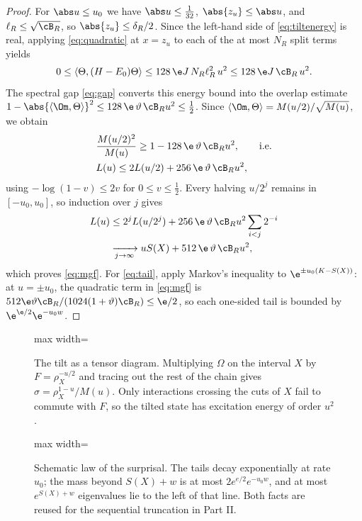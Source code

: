 \begin{proof}
For $\abs u\le u_0$ we have $\abs u\le\frac1{32}$, $\abs{z_u}\le\abs u$, and
$\ell_R\le\sqrt{\cB_R}$, so $\abs{z_u}\le\delta_R/2$. Since the left-hand
side of \eqref{eq:tiltenergy} is real, applying \eqref{eq:quadratic} at
$x=z_u$ to each of the at most $N_R$ split terms yields
\begin{equation}\label{eq:energyquad}
 0\le\langle\Theta,(H-E_0)\Theta\rangle\le 128\,\e J\,N_R\ell_R^2\,u^2
 \le 128\,\e J\,\cB_R\,u^2 .
\end{equation}
The spectral gap \eqref{eq:gap} converts this energy bound into the
overlap estimate
$1-\abs{\langle\Om,\Theta\rangle}^2\le 128\,\e\,\vartheta\,\cB_Ru^2\le\frac12$.
Since $\langle\Om,\Theta\rangle=M(u/2)/\sqrt{M(u)}$, we obtain
\[
\begin{split}
 &\frac{M(u/2)^2}{M(u)}\ge 1-128\,\e\,\vartheta\,\cB_R u^2,
 \qquad\text{i.e.}\\
 &L(u)\le 2L(u/2)+256\,\e\,\vartheta\,\cB_Ru^2,
\end{split}
\]
using $-\log(1-v)\le2v$ for $0\le v\le\frac12$. Every halving $u/2^j$
remains in $[-u_0,u_0]$, so induction over $j$ gives
\[
\begin{split}
 &L(u)\le 2^jL(u/2^j)+256\,\e\,\vartheta\,\cB_Ru^2\sum_{i<j}2^{-i}\\
 &\qquad\xrightarrow[j\to\infty]{} uS(X)+512\,\e\,\vartheta\,\cB_Ru^2 ,
\end{split}
\]
which proves \eqref{eq:mgf}. For \eqref{eq:tail}, apply Markov's inequality
to $\e^{\pm u_0(K-S(X))}$: at $u=\pm u_0$, the quadratic term in
\eqref{eq:mgf} is $512\e\vartheta\cB_R/(1024(1+\vartheta)\cB_R)\le\e/2$, so
each one-sided tail is bounded by $\e^{\e/2}\e^{-u_0w}$.
\end{proof}

\begin{figure}[t]
\centering
\begin{adjustbox}{max width=\linewidth}

\end{adjustbox}
\caption{The tilt as a tensor diagram. Multiplying $\Omega$ on the interval $X$ by $F=\rho_X^{-u/2}$ and tracing out the rest of the chain gives $\sigma=\rho_X^{1-u}/M(u)$. Only interactions crossing the cuts of $X$ fail to commute with $F$, so the tilted state has excitation energy of order $u^2$.}\label{fig:tilt}
\end{figure}

\begin{figure}[t]
\centering
\begin{adjustbox}{max width=\linewidth}

\end{adjustbox}
\caption{Schematic law of the surprisal. The tails decay exponentially at rate $u_0$; the mass beyond $S(X)+w$ is at most $2e^{e/2}e^{-u_0w}$, and at most $e^{S(X)+w}$ eigenvalues lie to the left of that line. Both facts are reused for the sequential truncation in Part II.}\label{fig:tail-sketch}
\end{figure}

